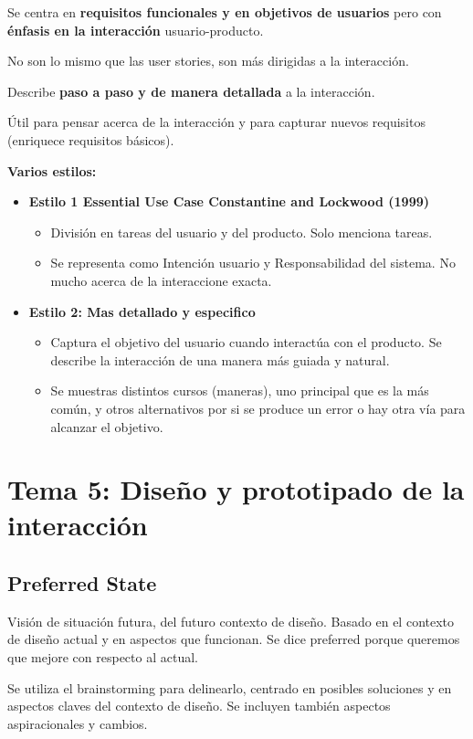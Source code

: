 \documentclass[12pt]{report} %
\begin{document}
Se centra en \textbf{requisitos funcionales y en objetivos de usuarios} pero
con \textbf{énfasis en la interacción} usuario-producto.

No son lo mismo que las user stories, son más dirigidas a la
interacción.

Describe \textbf{paso a paso y de manera detallada} a la interacción.

Útil para pensar acerca de la interacción y para capturar nuevos
requisitos (enriquece requisitos básicos).

\textbf{Varios estilos:}

\begin{itemize}
	\item \textbf{Estilo 1 Essential Use Case Constantine and Lockwood (1999)}
		\begin{itemize}
			\item División en tareas del usuario y del producto. Solo menciona tareas.
			\item Se representa como Intención usuario y Responsabilidad del sistema. No mucho acerca de la interaccione exacta.
		\end{itemize}
	\item \textbf{Estilo 2: Mas detallado y especifico}
		\begin{itemize}
			\item Captura el objetivo del usuario cuando interactúa con el producto. Se describe la interacción de una manera más guiada y natural.
			\item Se muestras distintos cursos (maneras), uno principal que es la más común, y otros alternativos por si se produce un error o hay otra vía para alcanzar el objetivo.
		\end{itemize}
\end{itemize}

\chapter{Tema 5: Diseño y prototipado de la interacción}

\section{Preferred State}
Visión de situación futura, del futuro contexto de diseño. Basado en el contexto de diseño actual y en aspectos que funcionan. Se dice preferred porque queremos que mejore con respecto al actual.

Se utiliza el brainstorming para delinearlo, centrado en posibles soluciones y en aspectos claves del contexto de diseño. Se incluyen también aspectos aspiracionales y cambios.
\end{document}
